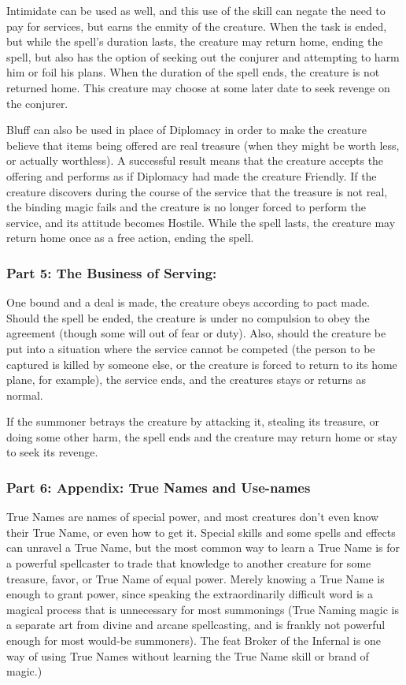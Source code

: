 Intimidate can be used as well, and this use of the skill can negate the need to pay for services, but earns the enmity of the creature. When the task is ended, but while the spell's duration lasts, the creature may return home, ending the spell, but also has the option of seeking out the conjurer and attempting to harm him or foil his plans. When the duration of the spell ends, the creature is not returned home. This creature may choose at some later date to seek revenge on the conjurer.

Bluff can also be used in place of Diplomacy in order to make the creature believe that items being offered are real treasure (when they might be worth less, or actually worthless). A successful result means that the creature accepts the offering and performs as if Diplomacy had made the creature Friendly. If the creature discovers during the course of the service that the treasure is not real, the binding magic fails and the creature is no longer forced to perform the service, and its attitude becomes Hostile. While the spell lasts, the creature may return home once as a free action, ending the spell.

\subsubsection{Part 5: The Business of Serving:}

One bound and a deal is made, the creature obeys according to pact made. Should the spell be ended, the creature is under no compulsion to obey the agreement (though some will out of fear or duty). Also, should the creature be put into a situation where the service cannot be competed (the person to be captured is killed by someone else, or the creature is forced to return to its home plane, for example), the service ends, and the creatures stays or returns as normal.

If the summoner betrays the creature by attacking it, stealing its treasure, or doing some other harm, the spell ends and the creature may return home or stay to seek its revenge.

\subsubsection{Part 6: Appendix: True Names and Use-names}
True Names are names of special power, and most creatures don't even know their True Name, or even how to get it. Special skills and some spells and effects can unravel a True Name, but the most common way to learn a True Name is for a powerful spellcaster to trade that knowledge to another creature for some treasure, favor, or True Name of equal power. Merely knowing a True Name is enough to grant power, since speaking the extraordinarily difficult word is a magical process that is unnecessary for most summonings (True Naming magic is a separate art from divine and arcane spellcasting, and is frankly not powerful enough for most would-be summoners). The feat Broker of the Infernal is one way of using True Names without learning the True Name skill or brand of magic.)

